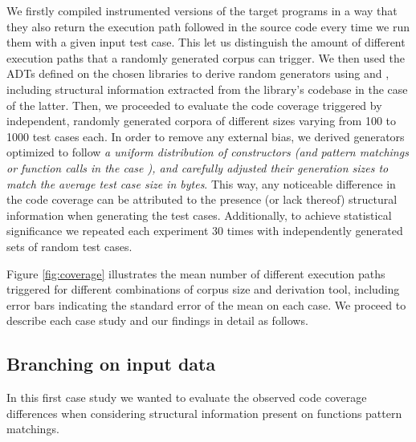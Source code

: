 We firstly compiled instrumented versions of the target programs in a way that
they also return the execution path followed in the source code every time we
run them with a given input test case.
%
This let us distinguish the amount of different execution paths that a randomly
generated corpus can trigger.
%
We then used the ADTs defined on the chosen libraries to derive random
generators using \dragen and \dragenp, including structural information
extracted from the library's codebase in the case of the latter.
%
Then, we proceeded to evaluate the code coverage triggered by independent,
randomly generated corpora of different sizes varying from 100 to 1000 test
cases each.
%
In order to remove any external bias, we derived generators optimized to follow
\emph{a uniform distribution of constructors (and pattern matchings or function
  calls in the case \dragenp), and carefully adjusted their generation sizes to
  match the average test case size in bytes}.
%
This way, any noticeable difference in the code coverage can be attributed to
the presence (or lack thereof) structural information when generating the test
cases.
%
Additionally, to achieve statistical significance we repeated each experiment 30
times with independently generated sets of random test cases.

\begin{figure*}[t]
  \vspace{-10pt}%
  \centering
  
  \hspace{5pt}%
  
  \caption{Path coverage comparison between \dragen (\ref{exp:dragen}) and
    \dragenp (\ref{exp:dragenp}). }
  \label{fig:coverage}
  \vspace{-12pt}%
\end{figure*}
%
Figure \ref{fig:coverage} illustrates the mean number of different execution
paths triggered for different combinations of corpus size and derivation tool,
including error bars indicating the standard error of the mean on each case.
%
We proceed to describe each case study and our findings in detail as follows.

\subsection{Branching on input data}

In this first case study we wanted to evaluate the observed code coverage
differences when considering structural information present on functions pattern
matchings.


